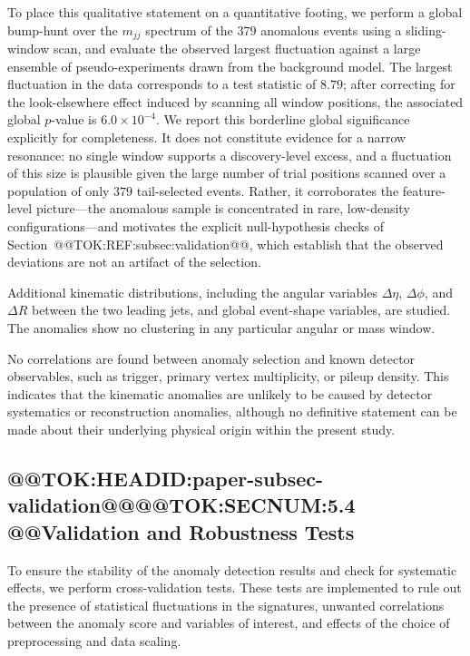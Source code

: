 \documentclass[11pt]{article}
\begin{document}
To place this qualitative statement on a quantitative footing, we perform a global bump-hunt over the $m_{jj}$ spectrum of the $379$ anomalous events using a sliding-window scan, and evaluate the observed largest fluctuation against a large ensemble of pseudo-experiments drawn from the background model. The largest fluctuation in the data corresponds to a test statistic of $8.79$; after correcting for the look-elsewhere effect induced by scanning all window positions, the associated global $p$-value is $6.0\times10^{-4}$. We report this borderline global significance explicitly for completeness. It does not constitute evidence for a narrow resonance: no single window supports a discovery-level excess, and a fluctuation of this size is plausible given the large number of trial positions scanned over a population of only $379$ tail-selected events. Rather, it corroborates the feature-level picture---the anomalous sample is concentrated in rare, low-density configurations---and motivates the explicit null-hypothesis checks of Section~@@TOK:REF:subsec:validation@@, which establish that the observed deviations are not an artifact of the selection.

Additional kinematic distributions, including the angular variables $\Delta\eta$, $\Delta\phi$, and $\Delta R$ between the two leading jets, and global event-shape variables, are studied. The anomalies show no clustering in any particular angular or mass window.

No correlations are found between anomaly selection and known detector observables, such as trigger, primary vertex multiplicity, or pileup density. This indicates that the kinematic anomalies are unlikely to be caused by detector systematics or reconstruction anomalies, although no definitive statement can be made about their underlying physical origin within the present study.

\subsection{@@TOK:HEADID:paper-subsec-validation@@@@TOK:SECNUM:5.4 @@Validation and Robustness Tests}

To ensure the stability of the anomaly detection results and check for systematic effects, we perform cross-validation tests. These tests are implemented to rule out the presence of statistical fluctuations in the signatures, unwanted correlations between the anomaly score and variables of interest, and effects of the choice of preprocessing and data scaling.
\end{document}
